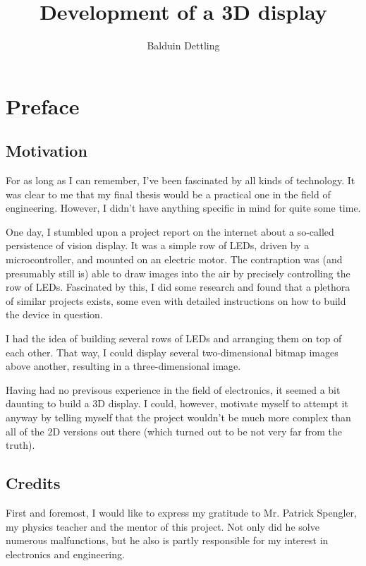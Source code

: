 \documentclass[a4paper, 11pt, titlepage]{report}
\begin{document}
\title{Development of a 3D display}
\author{Balduin Dettling}

\maketitle

\chapter*{Preface}


\section*{Motivation}

For as long as I can remember, I've been fascinated by all kinds of technology.
It was clear to me that my final thesis would be a practical one in the field of engineering.
However, I didn't have anything specific in mind for quite some time.

One day, I stumbled upon a project report on the internet about a so-called persistence of
vision display. It was a simple row of LEDs, driven by a microcontroller, and mounted on an
electric motor. The contraption was (and presumably still is) able to draw images into the
air by precisely controlling the row of LEDs. Fascinated by this, I did some research and
found that a plethora of similar projects exists, some even with detailed instructions on how
to build the device in question.

I had the idea of building several rows of LEDs and arranging them on top of each other.
That way, I could display several two-dimensional bitmap images above another, resulting in a
three-dimensional image.

Having had no previsous experience in the field of electronics, it seemed a bit daunting to
build a 3D display. I could, however, motivate myself to attempt it anyway by telling myself
that the project wouldn't be much more complex than all of the 2D versions out there (which
turned out to be not very far from the truth).


\section*{Credits}

First and foremost, I would like to express my gratitude to Mr. Patrick Spengler, my physics
teacher and the mentor of this project. Not only did he solve numerous malfunctions, but he also
is partly responsible for my interest in electronics and engineering.
\end{document}
